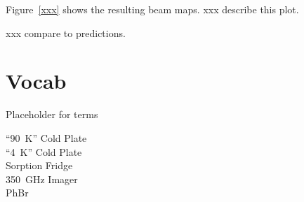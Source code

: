 \documentclass[10pt,twocolumn,article]{memoir}
\newcommand*{\figref}[1]{Figure~\ref{#1}}
\begin{document}
\figref{xxx} shows the resulting beam maps.
xxx describe this plot.

xxx compare to predictions.


\chapter{Vocab}

Placeholder for terms

\begin{description}
\item[``90~K'' Cold Plate]
\item[``4~K'' Cold Plate]
\item[Sorption Fridge]
\item[350~GHz Imager]
\item[PhBr]

\end{description}

\printbibliography
\end{document}
